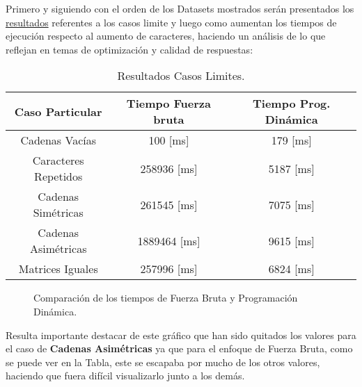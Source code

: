 Primero y siguiendo con el orden de los Datasets mostrados serán presentados los \hyperref[fig:imagen6]{resultados} referentes a los casos limite y luego como aumentan los tiempos de ejecución respecto al aumento de caracteres, haciendo un análisis de lo que reflejan en temas de optimización y calidad de respuestas:\\

\begin{table}[h!]
    \centering
    \begin{tabular}{|c|c|c|}
    \hline
    Caso Particular & Tiempo Fuerza bruta & Tiempo Prog. Dinámica \\ \hline
    Cadenas Vacías         & 100 [ms]     & 179 [ms]    \\ \hline
    Caracteres Repetidos   & 258936 [ms]  & 5187 [ms]   \\ \hline
    Cadenas Simétricas     & 261545 [ms]  & 7075 [ms]   \\ \hline
    Cadenas Asimétricas    & 1889464 [ms] & 9615 [ms]   \\ \hline
    Matrices Iguales       & 257996 [ms]  & 6824 [ms]   \\ \hline
    \end{tabular}
    \caption{Resultados Casos Limites.}
    \label{tab:resultados1}
\end{table}

\begin{figure}[h!]
    \centering
    \caption{Comparación de los tiempos de Fuerza Bruta y Programación Dinámica.}
\end{figure}

Resulta importante destacar de este gráfico que han sido quitados los valores para el caso de \textbf{Cadenas Asimétricas} ya que para el enfoque de Fuerza Bruta, como se puede ver en la Tabla, este se escapaba por mucho de los otros valores, haciendo que fuera difícil visualizarlo junto a los demás.\\

